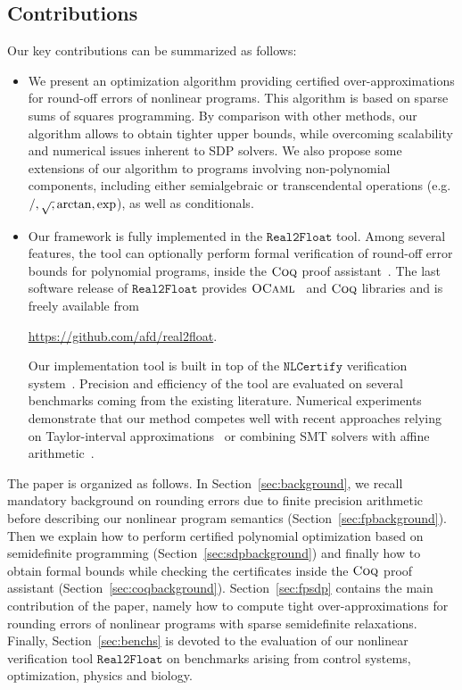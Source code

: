 \documentclass[preprint]{sigplanconf}
\newcommand{\realtofloat}{\mathtt{Real2Float}}
\newcommand{\coq}{\text{\sc Coq}}
\newcommand{\ocaml}{\text{\sc OCaml}}
\newcommand{\nlcertify}{\mathtt{NLCertify}}
\theoremstyle{plain}
\begin{document}
\subsection{Contributions}
Our key contributions can be summarized as follows:
\begin{itemize}
\item We present an optimization algorithm providing certified over-approximations for round-off errors of nonlinear programs. This algorithm is based on sparse sums of squares programming. By comparison with other methods, our algorithm allows to obtain tighter upper bounds, while overcoming scalability and numerical issues inherent to SDP solvers. We also propose some extensions of our algorithm to programs involving non-polynomial components, including either semialgebraic or transcendental operations (e.g. $/, \sqrtsign, \arctan, \exp$), as well as conditionals.
\item Our framework is fully implemented in the $\realtofloat$ tool.  Among several features, the tool can optionally perform formal verification of round-off error bounds for polynomial programs, inside the $\coq$ proof assistant~\cite{CoqProofAssistant}. The last software release of $\realtofloat$ provides $\ocaml$~\cite{OCaml} and $\coq$ libraries and is freely available from 
\begin{center}
\url{https://github.com/afd/real2float}.
\end{center}
%
Our implementation tool is built in top of the $\nlcertify$ verification system~\cite{icms14}. Precision and efficiency of the tool are evaluated on several benchmarks coming from the existing literature. Numerical experiments demonstrate that our method competes well with recent approaches relying on Taylor-interval approximations~\cite{Darulova14Popl} or combining SMT solvers with affine arithmetic~\cite{Darulova14Popl}.
\end{itemize}
%


The paper is organized as follows.
%
In Section~\ref{sec:background}, we recall mandatory background on rounding errors due to finite precision arithmetic before describing our nonlinear program semantics (Section~\ref{sec:fpbackground}). Then we explain how to perform certified polynomial optimization based on semidefinite programming (Section~\ref{sec:sdpbackground}) and finally how to obtain formal bounds while checking the certificates inside the $\coq$ proof assistant (Section~\ref{sec:coqbackground}).
%
Section~\ref{sec:fpsdp} contains the main contribution of the paper, namely how to compute tight over-approximations for rounding errors of nonlinear programs with sparse semidefinite relaxations.
%
Finally, Section~\ref{sec:benchs} is devoted to the evaluation of our nonlinear verification tool $\realtofloat$ on benchmarks arising from control systems, optimization, physics and biology.
\end{document}
